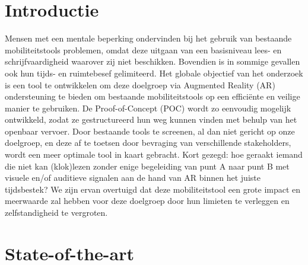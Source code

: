 
\section{Introductie}%
\label{sec:introductie}

    Mensen met een mentale beperking ondervinden bij het gebruik van bestaande mobiliteits\-tools problemen, omdat deze uitgaan van een basisniveau lees- en schrijfvaardigheid waarover zij niet beschikken. 
    Bovendien is in sommige gevallen ook hun tijds- en ruimtebesef gelimiteerd. 
    Het globale objectief van het onderzoek is een tool te ontwikkelen om deze doelgroep via Augmented Reality (AR) ondersteuning te bieden om bestaande mobiliteitstools op een efficiënte en veilige manier te gebruiken.
    De Proof-of-Concept (POC) wordt zo eenvoudig mogelijk ontwikkeld, zodat ze gestructureerd hun weg kunnen vinden met behulp van het openbaar vervoer. 
    Door bestaande tools te screenen, al dan niet gericht op onze doelgroep, en deze af te toetsen door bevraging van verschillende stakeholders, wordt een meer optimale tool in kaart gebracht. 
    Kort gezegd: hoe geraakt iemand die niet kan (klok)lezen zonder enige begeleiding van punt A naar punt B met visuele en/of auditieve signalen aan de hand van AR binnen het juiste tijdsbestek? We zijn ervan overtuigd dat deze mobiliteitstool een grote impact en meerwaarde zal hebben voor deze doelgroep door hun limieten te verleggen en zelfstandigheid te vergroten.


\section{State-of-the-art}%
\label{sec:state-of-the-art}

